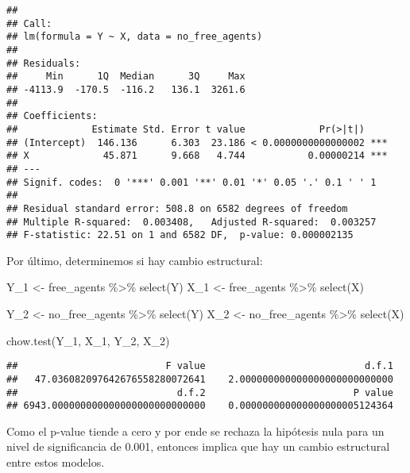 \documentclass[
]{article}
\newenvironment{Shaded}{\begin{snugshade}}{\end{snugshade}}
\newcommand{\FunctionTok}[1]{\textcolor[rgb]{0.00,0.00,0.00}{#1}}
\newcommand{\NormalTok}[1]{#1}
\newcommand{\OtherTok}[1]{\textcolor[rgb]{0.56,0.35,0.01}{#1}}
\newcommand{\SpecialCharTok}[1]{\textcolor[rgb]{0.00,0.00,0.00}{#1}}
\begin{document}
\begin{verbatim}
## 
## Call:
## lm(formula = Y ~ X, data = no_free_agents)
## 
## Residuals:
##     Min      1Q  Median      3Q     Max 
## -4113.9  -170.5  -116.2   136.1  3261.6 
## 
## Coefficients:
##             Estimate Std. Error t value             Pr(>|t|)    
## (Intercept)  146.136      6.303  23.186 < 0.0000000000000002 ***
## X             45.871      9.668   4.744           0.00000214 ***
## ---
## Signif. codes:  0 '***' 0.001 '**' 0.01 '*' 0.05 '.' 0.1 ' ' 1
## 
## Residual standard error: 508.8 on 6582 degrees of freedom
## Multiple R-squared:  0.003408,   Adjusted R-squared:  0.003257 
## F-statistic: 22.51 on 1 and 6582 DF,  p-value: 0.000002135
\end{verbatim}

Por último, determinemos si hay cambio estructural:

\begin{Shaded}
\begin{Highlighting}[]
\NormalTok{Y\_1 }\OtherTok{\textless{}{-}}\NormalTok{ free\_agents }\SpecialCharTok{\%\textgreater{}\%} \FunctionTok{select}\NormalTok{(Y)}
\NormalTok{X\_1 }\OtherTok{\textless{}{-}}\NormalTok{ free\_agents }\SpecialCharTok{\%\textgreater{}\%} \FunctionTok{select}\NormalTok{(X)}

\NormalTok{Y\_2 }\OtherTok{\textless{}{-}}\NormalTok{ no\_free\_agents }\SpecialCharTok{\%\textgreater{}\%} \FunctionTok{select}\NormalTok{(Y)}
\NormalTok{X\_2 }\OtherTok{\textless{}{-}}\NormalTok{ no\_free\_agents }\SpecialCharTok{\%\textgreater{}\%} \FunctionTok{select}\NormalTok{(X)}

\FunctionTok{chow.test}\NormalTok{(Y\_1, X\_1, Y\_2, X\_2)}
\end{Highlighting}
\end{Shaded}

\begin{verbatim}
##                          F value                            d.f.1 
##   47.036082097642676558280072641    2.000000000000000000000000000 
##                            d.f.2                          P value 
## 6943.000000000000000000000000000    0.000000000000000000005124364
\end{verbatim}

Como el p-value tiende a cero y por ende se rechaza la hipótesis nula
para un nivel de significancia de 0.001, entonces implica que hay un
cambio estructural entre estos modelos.
\end{document}
